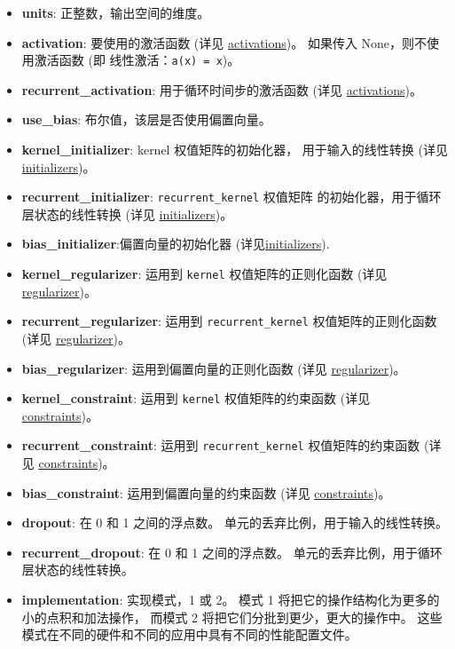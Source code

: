 \begin{itemize}
\tightlist
\item
  \textbf{units}: 正整数，输出空间的维度。
\item
  \textbf{activation}: 要使用的激活函数 (详见
  \hyperref[activations]{activations})。 如果传入
  None，则不使用激活函数 (即 线性激活：\texttt{a(x)\ =\ x})。
\item
  \textbf{recurrent\_activation}: 用于循环时间步的激活函数 (详见
  \hyperref[activations]{activations})。
\item
  \textbf{use\_bias}: 布尔值，该层是否使用偏置向量。
\item
  \textbf{kernel\_initializer}: kernel 权值矩阵的初始化器，
  用于输入的线性转换 (详见 \hyperref[initializers]{initializers})。
\item
  \textbf{recurrent\_initializer}: \texttt{recurrent\_kernel} 权值矩阵
  的初始化器，用于循环层状态的线性转换 (详见
  \hyperref[initializers]{initializers})。
\item
  \textbf{bias\_initializer}:偏置向量的初始化器
  (详见\hyperref[initializers]{initializers}).
\item
  \textbf{kernel\_regularizer}: 运用到 \texttt{kernel}
  权值矩阵的正则化函数 (详见 \hyperref[regularizers]{regularizer})。
\item
  \textbf{recurrent\_regularizer}: 运用到 \texttt{recurrent\_kernel}
  权值矩阵的正则化函数 (详见 \hyperref[regularizers]{regularizer})。
\item
  \textbf{bias\_regularizer}: 运用到偏置向量的正则化函数 (详见
  \hyperref[regularizers]{regularizer})。
\item
  \textbf{kernel\_constraint}: 运用到 \texttt{kernel} 权值矩阵的约束函数
  (详见 \hyperref[constraints]{constraints})。
\item
  \textbf{recurrent\_constraint}: 运用到 \texttt{recurrent\_kernel}
  权值矩阵的约束函数 (详见 \hyperref[constraints]{constraints})。
\item
  \textbf{bias\_constraint}: 运用到偏置向量的约束函数 (详见
  \hyperref[constraints]{constraints})。
\item
  \textbf{dropout}: 在 0 和 1 之间的浮点数。
  单元的丢弃比例，用于输入的线性转换。
\item
  \textbf{recurrent\_dropout}: 在 0 和 1 之间的浮点数。
  单元的丢弃比例，用于循环层状态的线性转换。
\item
  \textbf{implementation}: 实现模式，1 或 2。 模式 1
  将把它的操作结构化为更多的小的点积和加法操作， 而模式 2
  将把它们分批到更少，更大的操作中。
  这些模式在不同的硬件和不同的应用中具有不同的性能配置文件。
\end{itemize}




